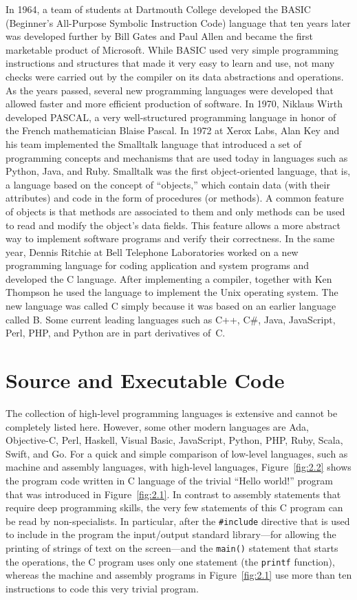 In 1964, a team of students at Dartmouth College developed the BASIC \hbox{(Beginner's} All-Purpose Symbolic Instruction Code) language that ten years later was developed further by Bill Gates and Paul Allen and became the first marketable product of Microsoft. While BASIC used very simple programming instructions and structures that made it very easy to learn and use, not many checks were carried out by the compiler on its data abstractions and operations. As the years passed, several new programming languages were developed that allowed faster and more efficient production of software. In 1970, Niklaus Wirth developed \hbox{PASCAL,} a very well-structured programming language in honor of the French mathematician Blaise Pascal. In 1972 at Xerox Labs, Alan Key and his team implemented the Smalltalk language that introduced a set of programming concepts and mechanisms that are used today in languages such as Python, Java, and Ruby. Smalltalk was the first object-oriented language, that is, a language based on the concept of ``objects,'' which contain data (with their attributes) and code in the form of procedures (or methods). A common feature of objects is that methods are associated to them and only methods can be used to read and modify the object's data fields. This feature allows a more abstract way to implement software programs and verify their correctness. In the same year, Dennis Ritchie at Bell Telephone Laboratories worked on a new programming language for coding application and system programs and developed the C language. After implementing a compiler, together with Ken Thompson he used the language to implement the Unix operating system. The new language was called C simply because it was based on an earlier language called B. Some current leading languages such as C++, C\#, Java, JavaScript, Perl, PHP, and Python are in part derivatives of~C. 

\section{\label{sec:2.6}Source and Executable Code}

The collection of high-level programming languages is extensive and cannot be completely listed here. However, some other modern languages are Ada, Objective-C, Perl, Haskell, Visual Basic, JavaScript, Python, PHP, Ruby, Scala, Swift, and Go. For a quick and simple comparison of low-level languages, such as machine and assembly languages, with high-level languages, Figure~\ref{fig:2.2} shows the program code written in C language of the trivial ``Hello world!'' program that was introduced in Figure~\ref{fig:2.1}. In contrast to assembly statements that require deep programming skills, the very few statements of this C program can be read by non-specialists. In particular, after the \texttt{\#include} directive that is used to include in the program the input/{\allowbreak}output standard library---for allowing the printing of strings of text on the screen---and the \texttt{main()} statement that starts the operations, the C program uses only one statement (the \texttt{printf} function), whereas the machine and assembly programs in Figure~\ref{fig:2.1} use more than ten instructions to code this very trivial program.

